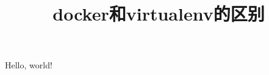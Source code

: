 \documentclass{article}
\title{docker和virtualenv的区别}
\begin{document}
\maketitle
Hello, world!
\end{document}
